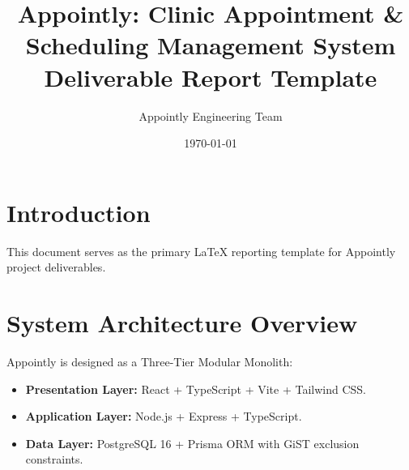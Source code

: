 \documentclass[12pt,a4paper]{article}
\title{\textbf{Appointly: Clinic Appointment \& Scheduling Management System}\\[0.5em]\large Deliverable Report Template}
\author{Appointly Engineering Team}
\date{\today}
\begin{document}
\maketitle
\tableofcontents
\newpage

\section{Introduction}
This document serves as the primary LaTeX reporting template for Appointly project deliverables.

\section{System Architecture Overview}
Appointly is designed as a Three-Tier Modular Monolith:
\begin{itemize}
    \item \textbf{Presentation Layer:} React + TypeScript + Vite + Tailwind CSS.
    \item \textbf{Application Layer:} Node.js + Express + TypeScript.
    \item \textbf{Data Layer:} PostgreSQL 16 + Prisma ORM with GiST exclusion constraints.
\end{itemize}
\end{document}
